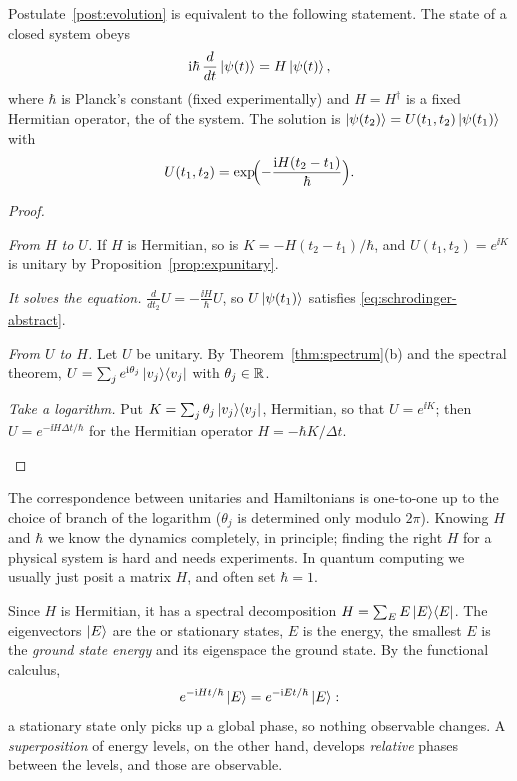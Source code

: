 \begin{proposition}\label{prop:schrodinger}
  Postulate~\ref{post:evolution} is equivalent to the following statement. The state of a closed system obeys
  \begin{equation}\label{eq:schrodinger-abstract}
    \mathrm{i}\hbar\,\frac{d}{dt}\left|\psi(t)\right\rangle=H\left|\psi(t)\right\rangle,
  \end{equation}
  where $\hbar$ is Planck's constant (fixed experimentally) and $H=H^\dagger$ is a fixed Hermitian operator, the  of the system. The solution is $\left|\psi(t_2)\right\rangle=U(t_1,t_2)\left|\psi(t_1)\right\rangle$ with
  \[
    U(t_1,t_2)=\exp\!\Bigl(-\frac{\mathrm{i} H(t_2-t_1)}{\hbar}\Bigr).
  \]
\end{proposition}
\begin{proof}
  \begin{steps}
    \item \emph{From $H$ to $U$.} If $H$ is Hermitian, so is $K=-H(t_2-t_1)/\hbar$, and $U(t_1,t_2)=e^{\ii K}$ is unitary by Proposition~\ref{prop:expunitary}.
    \item \emph{It solves the equation.} $\frac{d}{dt_2}U=-\frac{\ii H}{\hbar}U$, so $U\left|\psi(t_1)\right\rangle$ satisfies \eqref{eq:schrodinger-abstract}.
    \item \emph{From $U$ to $H$.} Let $U$ be unitary. By Theorem~\ref{thm:spectrum}(b) and the spectral theorem, $U=\sum_je^{\mathrm{i}\theta_j}\left|v_j\right\rangle\!\left\langle v_j\right|$ with $\theta_j\in\mathbb{R}$.
    \item \emph{Take a logarithm.} Put $K=\sum_j\theta_j\left|v_j\right\rangle\!\left\langle v_j\right|$, Hermitian, so that $U=e^{\ii K}$; then $U=e^{-\ii H\Delta t/\hbar}$ for the Hermitian operator $H=-\hbar K/\Delta t$. \qedhere
  \end{steps}
\end{proof}

The correspondence between unitaries and Hamiltonians is one-to-one up to the choice of branch of the logarithm ($\theta_j$ is determined only modulo $2\pi$). Knowing $H$ and $\hbar$ we know the dynamics completely, in principle; finding the right $H$ for a physical system is hard and needs experiments.
In quantum computing we usually just posit a matrix $H$, and often set $\hbar=1$.

Since $H$ is Hermitian, it has a spectral decomposition $H=\sum_EE\left|E\right\rangle\!\left\langle E\right|$. The eigenvectors $\left|E\right\rangle$ are the  or stationary states, $E$ is the energy, the smallest $E$ is the \emph{ground state energy} and its eigenspace the ground state. By the functional calculus,
\[
  e^{-\mathrm{i} Ht/\hbar}\left|E\right\rangle=e^{-\mathrm{i} Et/\hbar}\left|E\right\rangle :
\]
a stationary state only picks up a global phase, so nothing observable changes. A \emph{superposition} of energy levels, on the other hand, develops \emph{relative} phases between the levels, and those are observable.

